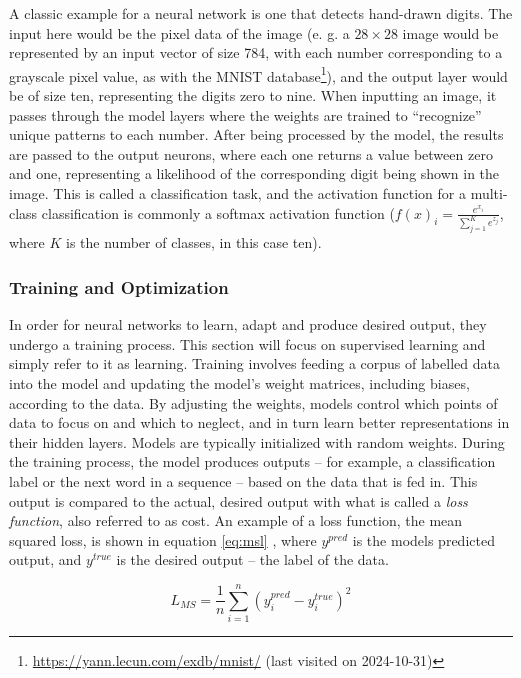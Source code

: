 A classic example for a neural network is one that detects hand-drawn digits.
The input here would be the pixel data of the image (e. g. a $28\times28$ image would be represented by an input vector of size 784, with each number corresponding to a grayscale pixel value, as with the MNIST database\footnote{\url{https://yann.lecun.com/exdb/mnist/} (last visited on 2024-10-31)}), and the output layer would be of size ten, representing the digits zero to nine.
When inputting an image, it passes through the model layers where the weights are trained to \enquote{recognize} unique patterns to each number.
After being processed by the model, the results are passed to the output neurons, where each one returns a value between zero and one, representing a likelihood of the corresponding digit being shown in the image.
This is called a classification task, and the activation function for a multi-class classification is commonly a softmax activation function ($f(x)_i = \frac{e^{x_i}}{\sum_{j=1}^{K}e^{z_j}}$, where $K$ is the number of classes, in this case ten).

\subsubsection{Training and Optimization}
\label{sec:gradient}
In order for neural networks to learn, adapt and produce desired output, they undergo a training process.
This section will focus on supervised learning and simply refer to it as learning.
Training involves feeding a corpus of labelled data into the model and updating the model's weight matrices, including biases, according to the data.
By adjusting the weights, models control which points of data to focus on and which to neglect, and in turn learn better representations in their hidden layers.
Models are typically initialized with random weights.
During the training process, the model produces outputs -- for example, a classification label or the next word in a sequence -- based on the data that is fed in.
This output is compared to the actual, desired output with what is called a \emph{loss function}, also referred to as cost.
An example of a loss function, the mean squared loss, is shown in equation \ref{eq:msl} \cite{Jurafsky.2024}, where $y^{pred}$ is the models predicted output, and $y^{true}$ is the desired output -- the label of the data.

\begin{equation}
    L_{MS} = \frac{1}{n}\sum_{i=1}^{n}(y^{pred}_i-y^{true}_i)^2
    \label{eq:msl}
\end{equation}

